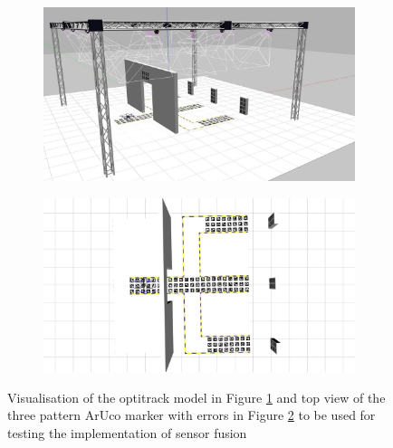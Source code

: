 \documentclass[../Head/report.tex]{subfiles}
\begin{document}
\begin{figure}[H]
    \centering
    \begin{subfigure}[t]{.48\textwidth}
        \centering
        \includegraphics[width=\textwidth]{../Figures/gazebo_three_pattern_error_view.jpg}
        \caption{}
        \label{fig:optitrack_three_pattern_aruco_error}
    \end{subfigure}
    \hfill
    \begin{subfigure}[t]{.48\textwidth}
        \centering
        \includegraphics[width=\textwidth]{../Figures/gazebo_three_pattern_error.jpg}
        \caption{}
        \label{fig:three_pattern_aruco_error}
    \end{subfigure}
    \caption{Visualisation of the optitrack model in Figure \ref{fig:optitrack_three_pattern_aruco_error} and top view of the three pattern ArUco marker with errors in Figure \ref{fig:three_pattern_aruco_error} to be used for testing the implementation of sensor fusion}
    \label{fig:three_pattern_aruco_error_fig}
\end{figure}
\end{document}
